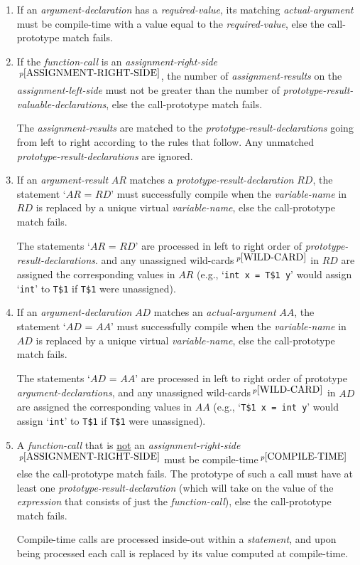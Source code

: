 \documentclass[12pt]{article}
\newcommand{\pagnote}[1]{$\,^{p\pageref{#1}}$}
\begin{document}
\begin{enumerate}
\item If an {\em argument-declaration} has a {\em required-value},
its matching {\em actual-argument} must be compile-time with
a value equal to the {\em required-value}, else the call-prototype
match fails.

\item If the {\em function-call} is an
{\em assignment-right-side}\pagnote{ASSIGNMENT-RIGHT-SIDE},
the number of {\em assignment-results} on the
{\em assignment-left-side} must not be greater than the number of
{\em prototype-result-valuable-declarations}, else the call-prototype
match fails.

The {\em assignment-results} are matched to the
{\em prototype-result-declarations} going from left to right
according to the rules that follow.
Any unmatched {\em prototype-result-declarations}
are ignored.  

\item If an {\em argument-result} $AR$ matches a
{\em prototype-result-declaration} $RD$, the statement `$AR$ = $RD$'
must successfully compile
when the {\em variable-name} in $RD$ is replaced by a unique virtual
{\em variable-name}, else the call-prototype match fails.

The statements `$AR$ = $RD$' are processed in left to right order of
{\em prototype-result-declarations}.
and any unassigned wild-cards\pagnote{WILD-CARD}
in $RD$ are assigned the corresponding
values in $AR$ (e.g., `{\tt int x = T\$1 y}' would assign `{\tt int}'
to {\tt T\$1} if {\tt T\$1} were unassigned).

\item If an {\em argument-declaration} $AD$ matches an {\em actual-argument}
$AA$, the statement `$AD$ = $AA$' must successfully compile
when the {\em variable-name} in $AD$ is replaced by a unique virtual
{\em variable-name}, else the call-prototype match fails.

The statements `$AD$ = $AA$' are processed in left to right order
of prototype {\em argument-declarations},
and any unassigned wild-cards\pagnote{WILD-CARD}
in $AD$ are assigned the corresponding
values in $AA$ (e.g., `{\tt T\$1 x = int y}' would assign `{\tt int}'
to {\tt T\$1} if {\tt T\$1} were unassigned).

\item A {\em function-call} that is \underline{not} an
{\em assignment-right-side}\pagnote{ASSIGNMENT-RIGHT-SIDE}
must be compile-time\pagnote{COMPILE-TIME} else the
call-prototype match fails.
The prototype of such a call must
have at least one {\em prototype-result-declaration} (which
will take on the value of the {\em expression} that consists of
just the {\em function-call}), else the
call-prototype match fails.

Compile-time calls are processed inside-out within a {\em statement},
and upon being processed each call is replaced by its value computed
at compile-time.

\end{enumerate}
\end{document}
